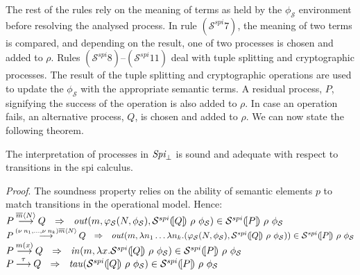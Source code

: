 \documentclass[10pt,a4paper,final,oneside,fleqn]{book}
\newcommand*{\todefout}{\mathbin{\mathop{\longrightarrow}\limits^{\overline{m}\langle N\rangle}}}
\newcommand*{\todefbout}{\mathbin{\mathop{\longrightarrow}\limits^{(\nu~\!n_1,\ldots,\nu~\!n_k)\overline{m}\langle N\rangle}}}
\newcommand*{\todefin}{\mathbin{\mathop{\longrightarrow}\limits^{m(x)}}}
\newcommand*{\todeftau}{\mathbin{\mathop{\longrightarrow}\limits^{\tau}}}
\begin{document}
The rest of the rules rely on the meaning of terms as held by the $\phi_\mathcal{S}$ environment before resolving the analysed process.  In rule $(\mathcal{S}^{spi}7)$, the meaning of two terms is compared, and depending on the result, one of two processes is chosen and added to $\rho$.  Rules $(\mathcal{S}^{spi}8)$--$(\mathcal{S}^{spi}11)$ deal with tuple splitting and cryptographic processes. The result of the tuple splitting and cryptographic operations are used to update the $\phi_\mathcal{S}$ with the appropriate semantic terms.  A residual process, $P$, signifying the success of the operation is also added to $\rho$.  In case an operation fails, an alternative process, $Q$, is chosen and added to $\rho$.  We can now state the following theorem.
\begin{theor} $ $\\
The interpretation of processes in $\mbox{{\itshape Spi}}_\bot$ is sound and adequate with respect to transitions in the spi calculus.
\end{theor}
{\itshape Proof\/}.  The soundness property relies on the ability of semantic elements $p$ to match transitions in the operational model.  Hence:\\
\noindent
$P\todefout Q~~\Rightarrow~~\mbox{{\itshape out\/}}(m,\varphi_\mathcal{S}(N,\phi_\mathcal{S}),\mathcal{S}^{spi}(\![Q]\!)~\rho~\phi_\mathcal{S})\in\mathcal{S}^{spi}(\![P]\!)~\rho~\phi_\mathcal{S}$\\
$P\todefbout Q~~\Rightarrow~~\mbox{{\itshape out\/}}(m,\lambda n_1\ldots\lambda n_k.(\varphi_\mathcal{S}(N,\phi_\mathcal{S}),\mathcal{S}^{spi}(\![Q]\!)~\rho~\phi_\mathcal{S}))\in\mathcal{S}^{spi}(\![P]\!)~\rho~\phi_\mathcal{S}$\\
$P\todefin Q~~\Rightarrow~~\mbox{{\itshape in\/}}(m,\lambda x.\mathcal{S}^{spi}(\![Q]\!)~\rho~\phi_\mathcal{S})\in\mathcal{S}^{spi}(\![P]\!)~\rho~\phi_\mathcal{S}$\\
$P\todeftau Q~~\Rightarrow~~\mbox{{\itshape tau\/}}(\mathcal{S}^{spi}(\![Q]\!)~\rho~\phi_\mathcal{S})\in\mathcal{S}^{spi}(\![P]\!)~\rho~\phi_\mathcal{S}$\vspace{5mm}
\end{document}
